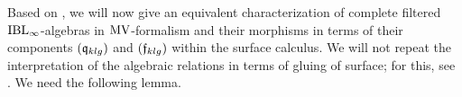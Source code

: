 \documentclass[\MainFolder/Text.tex]{subfiles}
\begin{document}
%

Based on \cite{Cieliebak2015}, we will now give an equivalent characterization of complete filtered $\mathrm{IBL}_\infty$-algebras in $\mathrm{MV}$-formalism and their morphisms in terms of their components $(\mathfrak{q}_{klg})$ and $(\mathfrak{f}_{klg})$ within the surface calculus. We will not repeat the interpretation of the algebraic relations in terms of gluing of surface; for this, see \cite{Cieliebak2015}. We need the following lemma.
\end{document}
